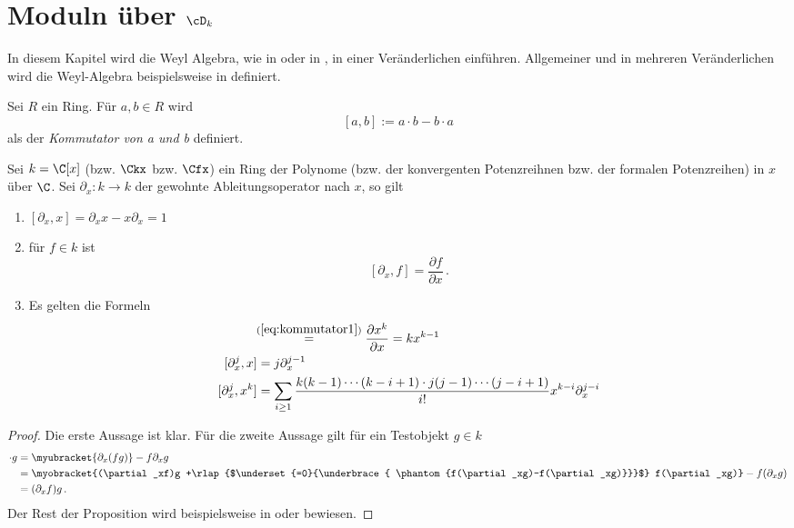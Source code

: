 \chapter{Moduln über $\cD_k$} \label{chap:dModuln}
In diesem Kapitel wird die Weyl Algebra, wie in
\cite[Chapter~1]{sabbah_cimpa90} oder in \cite[Kapittel~2]{ZulaBarbara}, in
einer Veränderlichen einführen.  Allgemeiner und in mehreren Veränderlichen
wird die Weyl-Algebra beispielsweise in \cite[Chapter~1]{coutinho1995primer}
definiert.

\begin{defn}[Kommutator]%
Sei $R$ ein Ring. Für $a,b\in R$ wird
\[[a,b]:=a\cdot b-b\cdot a\]
als der \emph{Kommutator von a und b} definiert.
\end{defn}

\begin{prop} \label{prop:d-modul-komutator-regeln}
Sei $k= \C[x]$ (bzw. $\Ckx$ bzw. $\Cfx$) ein Ring der Polynome (bzw. der
konvergenten Potenzreihnen bzw. der formalen Potenzreihen) in $x$ über $\C$.
Sei $\partial_x:k\rightarrow k$ der gewohnte Ableitungsoperator nach $x$, so
gilt
\begin{enumerate}
\item $[ \partial_x,x] = \partial_xx-x\partial_x=1 $
\item für $f\in k$ ist
\begin{equation} \label{eq:kommutator1}
[\partial_x,f] = \frac{\partial f}{\partial x} \,. 
\end{equation}
\item Es gelten die Formeln
\begin{align}
[\partial_x,x^k] &\!\!\overset{(\ref{eq:kommutator1})}{=}
  \frac{\partial x^k}{\partial x} = kx^{k-1}
  \label{eq:kommutator1b}\\
[\partial_x^j,x]   &= j\partial_x^{j-1}
  \label{eq:kommutator2}\\
[\partial_x^j,x^k] &= \sum_{i\geq1}\frac{k(k-1)\cdots(k-i+1)
  \cdot j(j-1)\cdots(j-i+1)}{i!}x^{k-i}\partial_x^{j-i}
  \label{eq:kommutator3}
\end{align}
\end{enumerate}
\end{prop}
\begin{proof}
Die erste Aussage ist klar. Für die zweite Aussage gilt für ein Testobjekt
$g\in k$
\begin{align*}
[\partial_x,f]\cdot g&=\myubracket{\partial_x(fg)}-f\partial_xg
\\&= \myobracket{(\partial_xf)g
  +\rlap{$\underset{=0}{\underbrace{ \phantom{f(\partial_xg)-f(\partial_xg)}}}$}
  f(\partial_xg)}-f(\partial_xg)
\\&= (\partial_xf)g \,.
\end{align*}
Der Rest der Proposition wird beispielsweise in \cite[1.2.4.]{sabbah_cimpa90}
oder \cite[Kor 2.8]{ZulaBarbara} bewiesen.
\end{proof}

